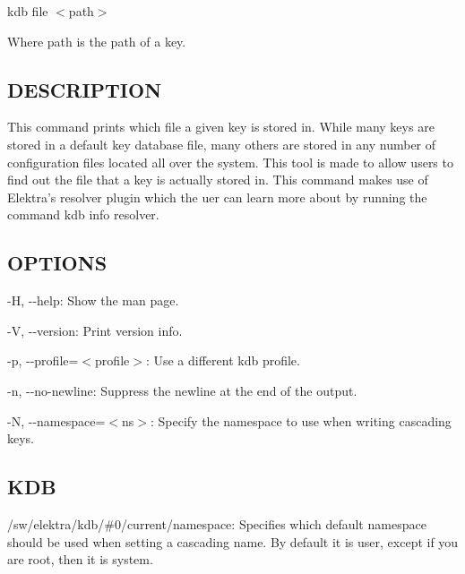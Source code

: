 {\ttfamily kdb file $<$path$>$}

Where {\ttfamily path} is the path of a key.

\subsection*{D\+E\+S\+C\+R\+I\+P\+T\+I\+O\+N}

This command prints which file a given key is stored in. While many keys are stored in a default key database file, many others are stored in any number of configuration files located all over the system. This tool is made to allow users to find out the file that a key is actually stored in. This command makes use of Elektra's {\ttfamily resolver} plugin which the uer can learn more about by running the command {\ttfamily kdb info resolver}.

\subsection*{O\+P\+T\+I\+O\+N\+S}


\begin{DoxyItemize}
\item {\ttfamily -\/\+H}, {\ttfamily -\/-\/help}\+: Show the man page.
\item {\ttfamily -\/\+V}, {\ttfamily -\/-\/version}\+: Print version info.
\item {\ttfamily -\/p}, {\ttfamily -\/-\/profile}=$<$profile$>$\+: Use a different kdb profile.
\item {\ttfamily -\/n}, {\ttfamily -\/-\/no-\/newline}\+: Suppress the newline at the end of the output.
\item {\ttfamily -\/\+N}, {\ttfamily -\/-\/namespace}=$<$ns$>$\+: Specify the namespace to use when writing cascading keys.
\end{DoxyItemize}

\subsection*{K\+D\+B}


\begin{DoxyItemize}
\item {\ttfamily /sw/elektra/kdb/\#0/current/namespace}\+: Specifies which default namespace should be used when setting a cascading name. By default it is {\ttfamily user}, except if you are root, then it is {\ttfamily system}.
\end{DoxyItemize}

